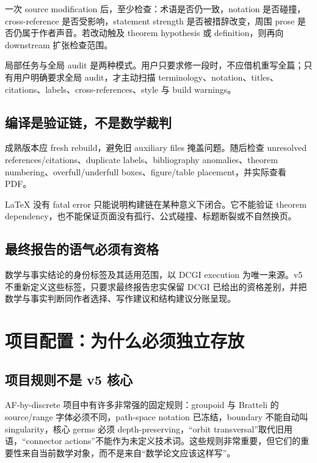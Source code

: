 \documentclass[UTF8,fontset=none,12pt,openany]{ctexbook}
\begin{document}
一次 source modification 后，至少检查：术语是否仍一致，notation 是否碰撞，cross-reference 是否受影响，statement strength 是否被措辞改变，周围 prose 是否仍属于作者声音。若改动触及 theorem hypothesis 或 definition，则再向 downstream 扩张检查范围。

局部任务与全局 audit 是两种模式。用户只要求修一段时，不应借机重写全篇；只有用户明确要求全局 audit，才主动扫描 terminology、notation、titles、citations、labels、cross-references、style 与 build warnings。

\section{编译是验证链，不是数学裁判}

成熟版本应 fresh rebuild，避免旧 auxiliary files 掩盖问题。随后检查 unresolved references/citations、duplicate labels、bibliography anomalies、theorem numbering、overfull/underfull boxes、figure/table placement，并实际查看 PDF。

\begin{warningbox}
LaTeX 没有 fatal error 只能说明构建链在某种意义下闭合。它不能验证 theorem dependency，也不能保证页面没有孤行、公式碰撞、标题断裂或不自然换页。
\end{warningbox}

\section{最终报告的语气必须有资格}

数学与事实结论的身份标签及其适用范围，以 DCGI execution 为唯一来源。v5 不重新定义这些标签，只要求最终报告忠实保留 DCGI 已给出的资格差别，并把数学与事实判断同作者选择、写作建议和结构建议分账呈现。

\chapter{项目配置：为什么必须独立存放}

\section{项目规则不是 v5 核心}

AF-by-discrete 项目中有许多非常强的固定规则：groupoid 与 Bratteli 的 source/range 字体必须不同，path-space notation 已冻结，boundary 不能自动叫 singularity，核心 germs 必须 depth-preserving，“orbit transversal”取代旧用语，“connector actions”不能作为未定义技术词。这些规则非常重要，但它们的重要性来自当前数学对象，而不是来自“数学论文应该这样写”。
\end{document}
